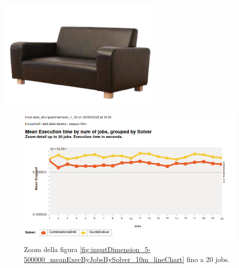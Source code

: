 \documentclass[compress]{beamer}
\begin{document}
    \begin{frame}{\subsecname \hfill \includegraphics[scale=0.1]{figs/sofastatsLogo.png}}
        \begin{figure}
            \includegraphics[scale=0.45]{../proofs/inputDimension_1-20_meanExecByJobsBySolver_lineChart.png}
            \caption[]{Zoom della figura \ref{fig:inputDimension_5-500000_meanExecByJobsBySolver_10m_lineChart}
            fino a 20 jobs.
            }
            \label{fig:inputDimension_1-20_meanExecByJobsBySolver_lineChart}
        \end{figure}        
    \end{frame}
\end{document}

